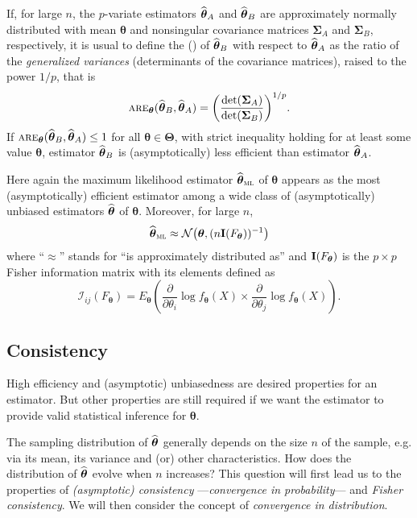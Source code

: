 If, for large $n$, the $p$-variate estimators $\widehat{\boldsymbol\theta}_A$ and
$\widehat{\boldsymbol\theta}_B$ are approximately normally distributed with mean
$\boldsymbol\theta$ and nonsingular covariance matrices $\boldsymbol\Sigma_A$ and
$\boldsymbol\Sigma_B$, respectively, it is usual to define the 
\emph{} () of
$\widehat{\boldsymbol\theta}_B$ with respect to $\widehat{\boldsymbol\theta}_A$ as
the ratio of the \emph{generalized variances} (determinants of the covariance
matrices), raised to the power $1/p$, that is
\[
    \stsc{ARE}_{\boldsymbol\theta}(\sthat{\boldsymbol\theta}_B, \sthat{\boldsymbol\theta}_A)
    = \left(\frac{ \det(\boldsymbol\Sigma_A)}{\det(\boldsymbol\Sigma_B)}\right)^{1/p}.
\]
If $\stsc{ARE}_{\boldsymbol\theta}(\sthat{\boldsymbol\theta}_B,
\sthat{\boldsymbol\theta}_A) \leq 1$ for all $\boldsymbol\theta \in \boldsymbol\Theta$, with strict inequality holding for at least some value $\boldsymbol\theta$, estimator $\widehat{\boldsymbol\theta}_B$ is
(asymptotically) less efficient than estimator $\widehat{\boldsymbol\theta}_A$.

Here again the maximum likelihood estimator $\sthat{\boldsymbol\theta}_\stsc{ML}$ of
$\boldsymbol\theta$ appears as the most (asymptotically) efficient estimator among a
wide class of (asymptotically) unbiased estimators $\widehat{\boldsymbol\theta}$ of
$\boldsymbol\theta$. Moreover, for large $n$,
\[
    \sthat{\boldsymbol\theta}_\stsc{ML} \approx 
    \mathcal{N}\left(\boldsymbol\theta, (n \stmat{I}(F_{\boldsymbol\theta}))^{-1}\right)
\]
where “$\approx$” stands for “is approximately distributed as” and
$\mathbf I(F_{\boldsymbol\theta})$ is the $p\times p$ Fisher information matrix
with its elements defined as
\[
    \mathcal{I}_{ij}\left(F_{\boldsymbol\theta}\right) =
    E_{\boldsymbol\theta}\left(
    \frac{\partial}{\partial\theta_i}\log f_{\boldsymbol\theta}(X) \times 
    \frac{\partial}{\partial \theta_j}\log f_{\boldsymbol\theta}(X)
    \right).
\] 


\subsection{Consistency}
\Index[consistency]{}

High efficiency and (asymptotic) unbiasedness are desired properties for an estimator. But other properties are still required if we want the estimator to provide valid statistical inference for $\boldsymbol\theta$.

The sampling distribution of $\widehat{\boldsymbol\theta}$ generally depends on the size $n$ of the sample, e.g. via its mean, its variance and (or) other characteristics. How does the distribution of $\widehat{\boldsymbol\theta}$ evolve when $n$ increases? This question will first lead us to the properties of \emph{(asymptotic) consistency} ---\emph{convergence in probability}--- and \emph{Fisher consistency}. We will  then consider the concept of \emph{convergence in distribution}.

